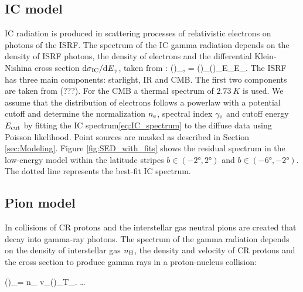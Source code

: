 \subsection{IC model}
\label{sec:IC_model}

IC radiation is produced in scattering processes of relativistic electrons on photons of the ISRF. The spectrum of the IC gamma radiation depends on the density of ISRF photons, the density of electrons and the differential Klein-Nishina cross section $\text{d} \sigma_{\text{IC}} / \text{d} E_\gamma$, taken from \citep{1970RvMP...42..237B}:
\be
\left(\right)_{\gamma,\IC} = \int \int \left(\right)_\ISRF {}\left(\right)_\el \de E_\ISRF \de E_\el.
\label{eq:IC_spectrum}
\ee
The ISRF has three main components: starlight, IR and CMB. The first two components are taken from (???). For the CMB a thermal spectrum of $\SI{2.73}{K}$ is used. We assume that the distribution of electrons follows a powerlaw with a potential cutoff
and determine the normalization $n_{\text{e}}$, spectral index $\gamma_{\text{e}}$ and cutoff energy $E_{\text{cut}}$  by fitting the IC spectrum\eqref{eq:IC_spectrum} to the diffuse \Fermi data using Poisson likelihood. Point sources are masked as described in Section \ref{sec:Modeling}. Figure \ref{fig:SED_with_fits} shows the residual spectrum in the low-energy model within the latitude stripes $b \in (-\ang{2}, \ang{2})$ and $b \in (-\ang{6}, -\ang{2})$. The dotted line represents the best-fit IC spectrum.





\subsection{Pion model}
\label{sec:Pion_model}

In collisions of CR protons and the interstellar gas neutral pions are created that decay into gamma-ray photons. The spectrum of the gamma radiation depends on the density of interstellar gas $n_{\text{H}}$, the density and velocity of CR protons and the cross section to produce gamma rays in a proton-nucleus collision:

\be
\left(\right)_\gamma = \int n_\Hy {} v_\pr \left(\right)_\pr \de T_\pr.
\ee
\dots